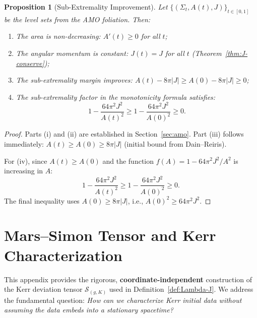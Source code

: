 \documentclass[12pt]{article}
\theoremstyle{plain}
\newtheorem{proposition}[theorem]{Proposition}
\theoremstyle{definition}
\theoremstyle{remark}
\begin{document}
\begin{proposition}[Sub-Extremality Improvement]\label{prop:subext-improve}
Let $\{(\Sigma_t, A(t), J)\}_{t \in [0,1]}$ be the level sets from the AMO foliation. Then:
\begin{enumerate}[label=\textup{(\roman*)}]
    \item The area is non-decreasing: $A'(t) \geq 0$ for all $t$;
    \item The angular momentum is constant: $J(t) = J$ for all $t$ (Theorem~\ref{thm:J-conserve});
    \item The sub-extremality margin improves: $A(t) - 8\pi|J| \geq A(0) - 8\pi|J| \geq 0$;
    \item The sub-extremality factor in the monotonicity formula satisfies:
    \[
    1 - \frac{64\pi^2 J^2}{A(t)^2} \geq 1 - \frac{64\pi^2 J^2}{A(0)^2} \geq 0.
    \]
\end{enumerate}
\end{proposition}

\begin{proof}
Parts (i) and (ii) are established in Section~\ref{sec:amo}. Part (iii) follows immediately: $A(t) \geq A(0) \geq 8\pi|J|$ (initial bound from Dain--Reiris).

For (iv), since $A(t) \geq A(0)$ and the function $f(A) = 1 - 64\pi^2 J^2/A^2$ is increasing in $A$:
\[
1 - \frac{64\pi^2 J^2}{A(t)^2} \geq 1 - \frac{64\pi^2 J^2}{A(0)^2} \geq 0.
\]
The final inequality uses $A(0) \geq 8\pi|J|$, i.e., $A(0)^2 \geq 64\pi^2 J^2$.
\end{proof}

\providecommand{\bysame}{\leavevmode\hbox to3em{\hrulefill}\thinspace}
\providecommand{\MR}{\relax\ifhmode\unskip\space\fi MR }
\providecommand{\MRhref}[2]{%
  \href{http://www.ams.org/mathscinet-getitem?mr=#1}{#2}
}
\providecommand{\href}[2]{#2}


\section{Mars--Simon Tensor and Kerr Characterization}\label{app:mars-simon}

This appendix provides the rigorous, \textbf{coordinate-independent} construction of the Kerr deviation tensor $\mathcal{S}_{(g,K)}$ used in Definition~\ref{def:Lambda-J}. We address the fundamental question: \textit{How can we characterize Kerr initial data without assuming the data embeds into a stationary spacetime?}
\end{document}
